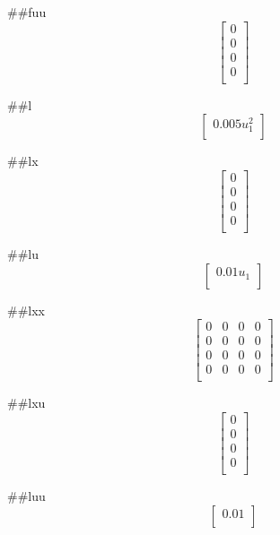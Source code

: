 ##fuu
\begin{equation}
\left[
\begin{array}{c}
0 \\
0 \\
0 \\
0 \\
\end{array}
\right]
\end{equation}


##l
\begin{equation}
\left[
\begin{array}{c}
0.005 u_1^{2} \\
\end{array}
\right]
\end{equation}


##lx
\begin{equation}
\left[
\begin{array}{c}
0 \\
0 \\
0 \\
0 \\
\end{array}
\right]
\end{equation}


##lu
\begin{equation}
\left[
\begin{array}{c}
0.01 u_1 \\
\end{array}
\right]
\end{equation}


##lxx
\begin{equation}
\left[
\begin{array}{cccc}
0 & 0 & 0 & 0 \\
0 & 0 & 0 & 0 \\
0 & 0 & 0 & 0 \\
0 & 0 & 0 & 0 \\
\end{array}
\right]
\end{equation}


##lxu
\begin{equation}
\left[
\begin{array}{c}
0 \\
0 \\
0 \\
0 \\
\end{array}
\right]
\end{equation}


##luu
\begin{equation}
\left[
\begin{array}{c}
0.01 \\
\end{array}
\right]
\end{equation}


